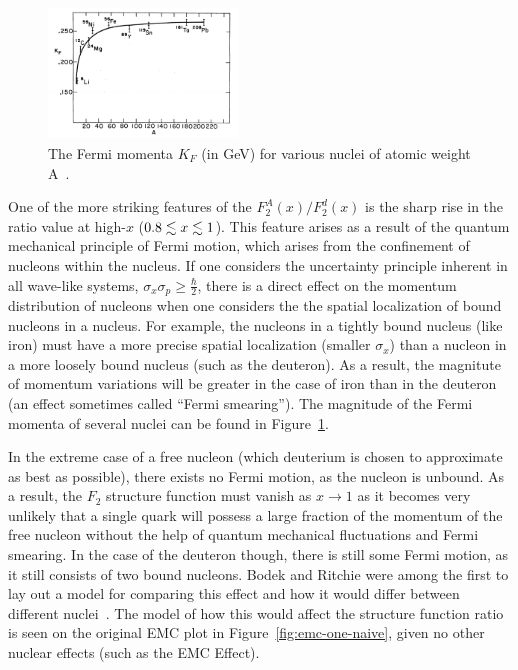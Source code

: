 \begin{figure}
	\centering
	\includegraphics[width=0.45\textwidth]{figures/background/fermi-momentum.png}
	\caption{The Fermi momenta $K_F$ (in GeV) for various nuclei of atomic weight A~\cite{PhysRevD.23.1070}.}
	\vspace{-20pt}
	\label{fig:fermi-momentum}
\end{figure}
One of the more striking features of the $F_2^A(x)/F_2^d(x)$ is the sharp rise in the ratio value at high-$x$ ($0.8\nobreak\lesssim\nobreak x\nobreak\lesssim\nobreak1$). This feature arises as a result of the quantum mechanical principle of Fermi motion, which arises from the confinement of nucleons within the nucleus. If one considers the uncertainty principle inherent in all wave-like systems, $\sigma_x \sigma_p \geq \frac{\hbar}{2}$, there is a direct effect on the momentum distribution of nucleons when one considers the the spatial localization of bound nucleons in a nucleus. For example, the nucleons in a tightly bound nucleus (like iron) must have a more precise spatial localization (smaller $\sigma_x$) than a nucleon in a more loosely bound nucleus (such as the deuteron). As a result, the magnitute of momentum variations will be greater in the case of iron than in the deuteron (an effect sometimes called ``Fermi smearing''). The magnitude of the Fermi momenta of several nuclei can be found in Figure~\ref{fig:fermi-momentum}.

In the extreme case of a free nucleon (which deuterium is chosen to approximate as best as possible), there exists no Fermi motion, as the nucleon is unbound. As a result, the $F_2$ structure function must vanish as $x\rightarrow1$ as it becomes very unlikely that a single quark will possess a large fraction of the momentum of the free nucleon without the help of quantum mechanical fluctuations and Fermi smearing. In the case of the deuteron though, there is still some Fermi motion, as it still consists of two bound nucleons. Bodek and Ritchie were among the first to lay out a model for comparing this effect and how it would differ between different nuclei~\cite{PhysRevD.23.1070}.  The model of how this would affect the structure function ratio is seen on the original EMC plot in Figure~\ref{fig:emc-one-naive}, given no other nuclear effects (such as the EMC Effect).

